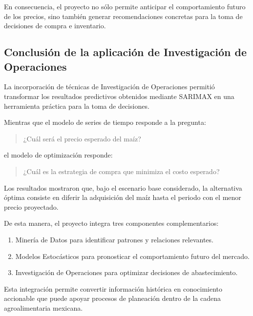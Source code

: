 \documentclass[11pt]{article}
\providecommand{\tightlist}{%
      \setlength{\itemsep}{0pt}\setlength{\parskip}{0pt}}
\begin{document}
En consecuencia, el proyecto no sólo permite anticipar el comportamiento
futuro de los precios, sino también generar recomendaciones concretas
para la toma de decisiones de compra e inventario.

    \hypertarget{conclusiuxf3n-de-la-aplicaciuxf3n-de-investigaciuxf3n-de-operaciones}{%
\subsection{Conclusión de la aplicación de Investigación de
Operaciones}\label{conclusiuxf3n-de-la-aplicaciuxf3n-de-investigaciuxf3n-de-operaciones}}

La incorporación de técnicas de Investigación de Operaciones permitió
transformar los resultados predictivos obtenidos mediante SARIMAX en una
herramienta práctica para la toma de decisiones.

Mientras que el modelo de series de tiempo responde a la pregunta:

\begin{quote}
¿Cuál será el precio esperado del maíz?
\end{quote}

el modelo de optimización responde:

\begin{quote}
¿Cuál es la estrategia de compra que minimiza el costo esperado?
\end{quote}

Los resultados mostraron que, bajo el escenario base considerado, la
alternativa óptima consiste en diferir la adquisición del maíz hasta el
periodo con el menor precio proyectado.

De esta manera, el proyecto integra tres componentes complementarios:

\begin{enumerate}
\def\labelenumi{\arabic{enumi}.}
\tightlist
\item
  Minería de Datos para identificar patrones y relaciones relevantes.
\item
  Modelos Estocásticos para pronosticar el comportamiento futuro del
  mercado.
\item
  Investigación de Operaciones para optimizar decisiones de
  abastecimiento.
\end{enumerate}

Esta integración permite convertir información histórica en conocimiento
accionable que puede apoyar procesos de planeación dentro de la cadena
agroalimentaria mexicana.
\end{document}
